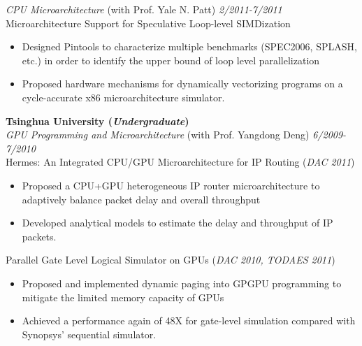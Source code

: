 \documentclass[margin, 9pt]{res} %
\begin{document}
\begin{resume}
\medskip
{\large\textit{CPU Microarchitecture} (with Prof. Yale N. Patt)} \hfill\textit{2/2011-7/2011}\\

\vspace*{-7pt}
Microarchitecture Support for Speculative Loop-level SIMDization\\
\vspace*{-10pt}
\begin{itemize}[leftmargin=*] \itemsep -3pt
\vspace*{-5pt}
	\item Designed Pintools to characterize multiple benchmarks (SPEC2006, SPLASH, etc.) in order to identify the upper bound of loop level parallelization
	\item Proposed hardware mechanisms for dynamically vectorizing programs on a cycle-accurate x86 microarchitecture simulator.
\end{itemize}

\bigskip
{\large\textbf{Tsinghua University (\textit{Undergraduate})}}\\

\vspace*{-7pt}
{\large\textit{GPU Programming and Microarchitecture} (with Prof. Yangdong Deng)} \hfill\textit{6/2009-7/2010}\\

\vspace*{-7pt}
Hermes: An Integrated CPU/GPU Microarchitecture for IP Routing \hfill(\textit{DAC 2011})\\
\vspace*{-10pt}
\begin{itemize}[leftmargin=*] \itemsep -3pt
\vspace*{-5pt}
	\item Proposed a CPU+GPU heterogeneous IP router microarchitecture to adaptively balance packet delay and overall throughput
	\item Developed analytical models to estimate the delay and throughput of IP packets.
\end{itemize}

\medskip
Parallel Gate Level Logical Simulator on GPUs \hfill(\textit{DAC 2010, TODAES 2011})\\
\vspace*{-10pt}
\begin{itemize}[leftmargin=*] \itemsep -3pt
\vspace*{-5pt}
	\item Proposed and implemented dynamic paging into GPGPU programming to mitigate the limited memory capacity of GPUs
	\item Achieved a performance again of 48X for gate-level simulation compared with Synopsys' sequential simulator.
\end{itemize}


\end{resume}
\end{document}
